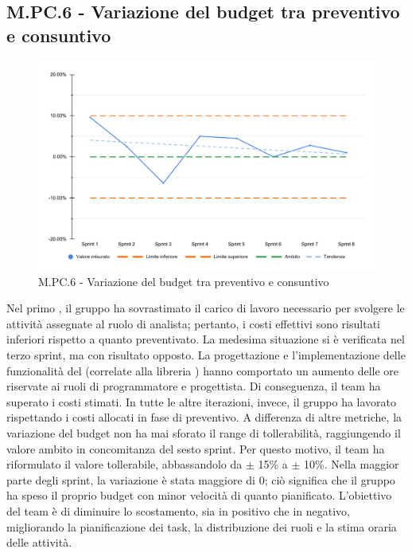 \subsection{M.PC.6 - Variazione del budget tra preventivo e consuntivo}
\begin{figure}[H]
    \centering
    \includegraphics[width=\textwidth]{assets/variazione_budget.pdf}
    \caption{M.PC.6 - Variazione del budget tra preventivo e consuntivo}
\end{figure}

\par Nel primo , il gruppo ha sovrastimato il carico di lavoro necessario per svolgere le attività assegnate al ruolo di analista; pertanto, i costi effettivi sono risultati inferiori rispetto a quanto preventivato. La medesima situazione si è verificata nel terzo sprint, ma con risultato opposto. La progettazione e l’implementazione delle funzionalità del  (correlate alla libreria ) hanno comportato un aumento delle ore riservate ai ruoli di programmatore e progettista. Di conseguenza, il team ha superato i costi stimati. In tutte le altre iterazioni, invece, il gruppo ha lavorato rispettando i costi allocati in fase di preventivo. A differenza di altre metriche, la variazione del budget non ha mai sforato il range di tollerabilità, raggiungendo il valore ambito in concomitanza del sesto sprint. Per questo motivo, il team ha riformulato il valore tollerabile, abbassandolo da $\pm$ 15\% a $\pm$ 10\%. Nella maggior parte degli sprint, la variazione è stata maggiore di 0; ciò significa che il gruppo ha speso il proprio budget con minor velocità di quanto pianificato. L’obiettivo del team è di diminuire lo scostamento, sia in positivo che in negativo, migliorando la pianificazione dei task, la distribuzione dei ruoli e la stima oraria delle attività.
